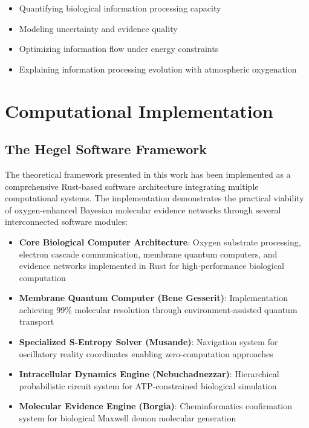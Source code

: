 \documentclass[12pt,a4paper]{article}
\begin{document}
\begin{itemize}
\item Quantifying biological information processing capacity
\item Modeling uncertainty and evidence quality
\item Optimizing information flow under energy constraints
\item Explaining information processing evolution with atmospheric oxygenation
\end{itemize}

\section{Computational Implementation}

\subsection{The Hegel Software Framework}

The theoretical framework presented in this work has been implemented as a comprehensive Rust-based software architecture integrating multiple computational systems. The implementation demonstrates the practical viability of oxygen-enhanced Bayesian molecular evidence networks through several interconnected software modules:

\begin{itemize}
\item \textbf{Core Biological Computer Architecture}: Oxygen substrate processing, electron cascade communication, membrane quantum computers, and evidence networks implemented in Rust for high-performance biological computation \citep{hegel2024}
\item \textbf{Membrane Quantum Computer (Bene Gesserit)}: Implementation achieving 99\% molecular resolution through environment-assisted quantum transport \citep{benegesserit2024}
\item \textbf{Specialized S-Entropy Solver (Musande)}: Navigation system for oscillatory reality coordinates enabling zero-computation approaches \citep{musande2024}
\item \textbf{Intracellular Dynamics Engine (Nebuchadnezzar)}: Hierarchical probabilistic circuit system for ATP-constrained biological simulation \citep{nebuchadnezzar2024}
\item \textbf{Molecular Evidence Engine (Borgia)}: Cheminformatics confirmation system for biological Maxwell demon molecular generation \citep{borgia2024}
\end{itemize}
\end{document}
